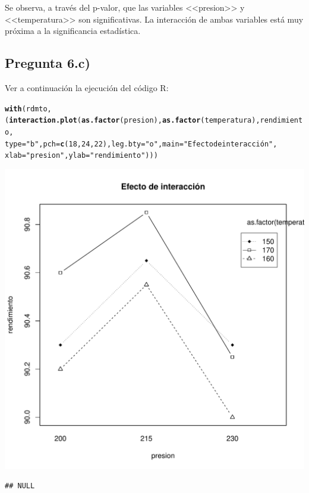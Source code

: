\documentclass[10pt,a4paper]{article}\usepackage[]{graphicx}\usepackage[]{color}
\makeatletter
\def\maxwidth{ %
  \ifdim\Gin@nat@width>\linewidth
    \linewidth
  \else
    \Gin@nat@width
  \fi
}
\newcommand{\hlnum}[1]{\textcolor[rgb]{0.686,0.059,0.569}{#1}}%
\newcommand{\hlstr}[1]{\textcolor[rgb]{0.192,0.494,0.8}{#1}}%
\newcommand{\hlstd}[1]{\textcolor[rgb]{0.345,0.345,0.345}{#1}}%
\newcommand{\hlkwc}[1]{\textcolor[rgb]{0.333,0.667,0.333}{#1}}%
\newcommand{\hlkwd}[1]{\textcolor[rgb]{0.737,0.353,0.396}{\textbf{#1}}}%
\newenvironment{kframe}{%
 \def\at@end@of@kframe{}%
 \ifinner\ifhmode%
  \def\at@end@of@kframe{\end{minipage}}%
  \begin{minipage}{\columnwidth}%
 \fi\fi%
 \def\FrameCommand##1{\hskip\@totalleftmargin \hskip-\fboxsep
 \colorbox{shadecolor}{##1}\hskip-\fboxsep
     \hskip-\linewidth \hskip-\@totalleftmargin \hskip\columnwidth}%
 \MakeFramed {\advance\hsize-\width
   \@totalleftmargin\z@ \linewidth\hsize
   \@setminipage}}%
 {\par\unskip\endMakeFramed%
 \at@end@of@kframe}
\newenvironment{knitrout}{}{} %
\makeatother
\begin{document}
Se observa, a través del p-valor, que las variables <<presion>> y <<temperatura>> son significativas. La interacción de ambas variables está muy próxima a la significancia estadística.

\subsection{Pregunta 6.c)}

Ver a continuación la ejecución del código R:

\begin{knitrout}\small
{}\color{fgcolor}\begin{kframe}
\begin{alltt}
\hlkwd{with}\hlstd{(rdmto, (}\hlkwd{interaction.plot}\hlstd{(}\hlkwd{as.factor}\hlstd{(presion),} \hlkwd{as.factor}\hlstd{(temperatura), rendimiento,}
    \hlkwc{type} \hlstd{=} \hlstr{"b"}\hlstd{,} \hlkwc{pch} \hlstd{=} \hlkwd{c}\hlstd{(}\hlnum{18}\hlstd{,} \hlnum{24}\hlstd{,} \hlnum{22}\hlstd{),} \hlkwc{leg.bty} \hlstd{=} \hlstr{"o"}\hlstd{,} \hlkwc{main} \hlstd{=} \hlstr{"Efecto de interacción"}\hlstd{,}
    \hlkwc{xlab} \hlstd{=} \hlstr{"presion"}\hlstd{,} \hlkwc{ylab} \hlstd{=} \hlstr{"rendimiento"}\hlstd{)))}
\end{alltt}
\end{kframe}
\includegraphics[width=\maxwidth]{figure/preg6_c-1} 
\begin{kframe}\begin{verbatim}
## NULL
\end{verbatim}
\end{kframe}
\end{knitrout}
\end{document}
